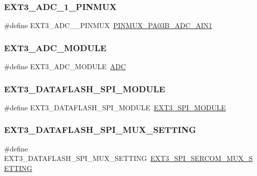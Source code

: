 \subsubsection{\texorpdfstring{EXT3\_ADC\_1\_PINMUX}{EXT3\_ADC\_1\_PINMUX}}
{\footnotesize\ttfamily \#define E\+X\+T3\+\_\+\+A\+D\+C\+\_\+\_\+\+P\+I\+N\+M\+UX~\mbox{\hyperlink{pio_2samd21j18a_8h_a33675d8f161bbb880b11380d504c7008}{P\+I\+N\+M\+U\+X\+\_\+\+P\+A03\+B\+\_\+\+A\+D\+C\+\_\+\+A\+I\+N1}}}

\mbox{\label{group__samd21__xplained__pro__features__group_ga1c580a78f53f567f9d686e2a84a22071}} 
\subsubsection{\texorpdfstring{EXT3\_ADC\_MODULE}{EXT3\_ADC\_MODULE}}
{\footnotesize\ttfamily \#define E\+X\+T3\+\_\+\+A\+D\+C\+\_\+\+M\+O\+D\+U\+LE~\mbox{\hyperlink{group___s_a_m_d21_j18_a__base_ga54d148b91f3d356713f7e367a2243bea}{A\+DC}}}

\mbox{\label{group__samd21__xplained__pro__features__group_gaf02aebb8627c8319a574bb412fb7c5ff}} 
\subsubsection{\texorpdfstring{EXT3\_DATAFLASH\_SPI\_MODULE}{EXT3\_DATAFLASH\_SPI\_MODULE}}
{\footnotesize\ttfamily \#define E\+X\+T3\+\_\+\+D\+A\+T\+A\+F\+L\+A\+S\+H\+\_\+\+S\+P\+I\+\_\+\+M\+O\+D\+U\+LE~\mbox{\hyperlink{group__samd21__xplained__pro__features__group_gabc0417beba6a839dc92dc896b683bdc9}{E\+X\+T3\+\_\+\+S\+P\+I\+\_\+\+M\+O\+D\+U\+LE}}}

\mbox{\label{group__samd21__xplained__pro__features__group_gaa6da49d31abd4b7fe6507af745aaea2d}} 
\subsubsection{\texorpdfstring{EXT3\_DATAFLASH\_SPI\_MUX\_SETTING}{EXT3\_DATAFLASH\_SPI\_MUX\_SETTING}}
{\footnotesize\ttfamily \#define E\+X\+T3\+\_\+\+D\+A\+T\+A\+F\+L\+A\+S\+H\+\_\+\+S\+P\+I\+\_\+\+M\+U\+X\+\_\+\+S\+E\+T\+T\+I\+NG~\mbox{\hyperlink{group__samd21__xplained__pro__features__group_ga8d4d30895d2d69a41519f7bd6186fa42}{E\+X\+T3\+\_\+\+S\+P\+I\+\_\+\+S\+E\+R\+C\+O\+M\+\_\+\+M\+U\+X\+\_\+\+S\+E\+T\+T\+I\+NG}}}

